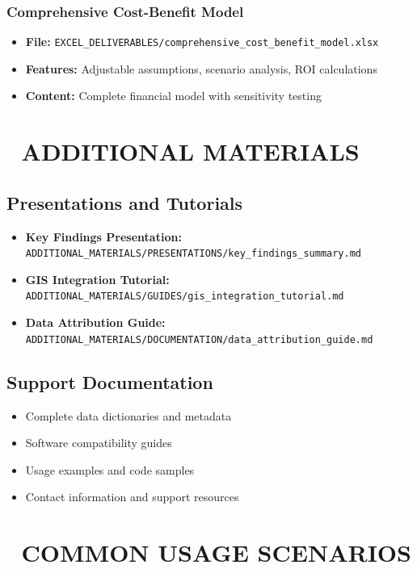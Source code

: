 \documentclass[11pt,letterpaper]{article}
\begin{document}
\subsubsection{Comprehensive Cost-Benefit Model}
\begin{itemize}
    \item \textbf{File:} \texttt{EXCEL\_DELIVERABLES/comprehensive\_cost\_benefit\_model.xlsx}
    \item \textbf{Features:} Adjustable assumptions, scenario analysis, ROI calculations
    \item \textbf{Content:} Complete financial model with sensitivity testing
\end{itemize}

\section{🎯 ADDITIONAL MATERIALS}

\subsection{Presentations and Tutorials}
\begin{itemize}
    \item \textbf{Key Findings Presentation:} \texttt{ADDITIONAL\_MATERIALS/PRESENTATIONS/key\_findings\_summary.md}
    \item \textbf{GIS Integration Tutorial:} \texttt{ADDITIONAL\_MATERIALS/GUIDES/gis\_integration\_tutorial.md}
    \item \textbf{Data Attribution Guide:} \texttt{ADDITIONAL\_MATERIALS/DOCUMENTATION/data\_attribution\_guide.md}
\end{itemize}

\subsection{Support Documentation}
\begin{itemize}
    \item Complete data dictionaries and metadata
    \item Software compatibility guides
    \item Usage examples and code samples
    \item Contact information and support resources
\end{itemize}

\section{🎪 COMMON USAGE SCENARIOS}
\end{document}
